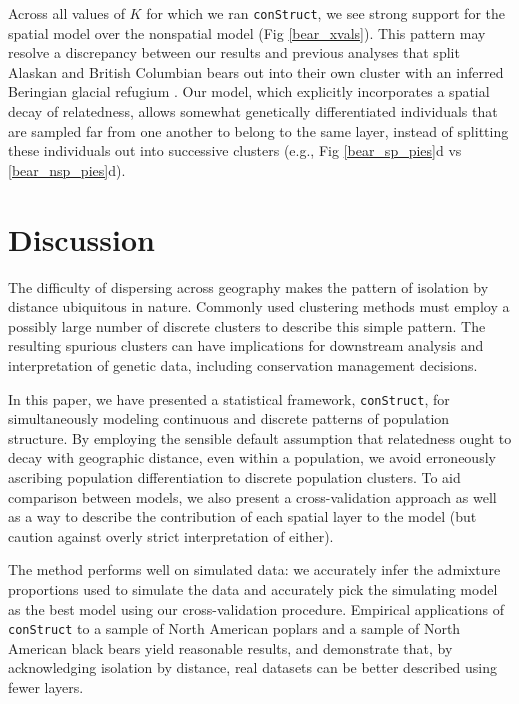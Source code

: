 \documentclass[10pt,letterpaper]{article}
\begin{document}
Across all values of $K$ for which we ran \texttt{conStruct},
we see strong support for the spatial model over the nonspatial model (Fig \ref{bear_xvals}).
This pattern may resolve a discrepancy between our results and 
previous analyses that split Alaskan and British Columbian bears out 
into their own cluster with an inferred Beringian glacial refugium
\cite{Byun1997,Stone2000,Puckett2015}.
Our model, which explicitly incorporates a spatial decay of relatedness, 
allows somewhat genetically differentiated individuals 
that are sampled far from one another to belong to the same layer,
instead of splitting these individuals out into successive clusters 
(e.g., Fig \ref{bear_sp_pies}d vs \ref{bear_nsp_pies}d).

\section*{Discussion}

The difficulty of dispersing across geography makes
the pattern of isolation by distance ubiquitous in nature.
Commonly used clustering methods
must employ a possibly large number of discrete clusters
to describe this simple pattern.
The resulting spurious clusters can have implications for 
downstream analysis and interpretation of genetic data, 
including conservation management decisions. 

In this paper, we have presented a statistical framework, \texttt{conStruct}, for simultaneously 
modeling continuous and discrete patterns of population structure.
By employing the sensible default assumption
that relatedness ought to decay with geographic distance, even within a population, 
we avoid erroneously ascribing population differentiation to discrete population clusters.
To aid comparison between models,
we also present a cross-validation approach 
as well as a way to describe the contribution of each spatial layer to the model
(but caution against overly strict interpretation of either).

The method performs well on simulated data:
we accurately infer the admixture proportions used to simulate the data 
and accurately pick the simulating model as the best model using our cross-validation procedure.
Empirical applications of \texttt{conStruct} to a sample of North American poplars 
and a sample of North American black bears yield reasonable results,
and demonstrate that,
by acknowledging isolation by distance,
real datasets can be better described using fewer layers.
\end{document}
